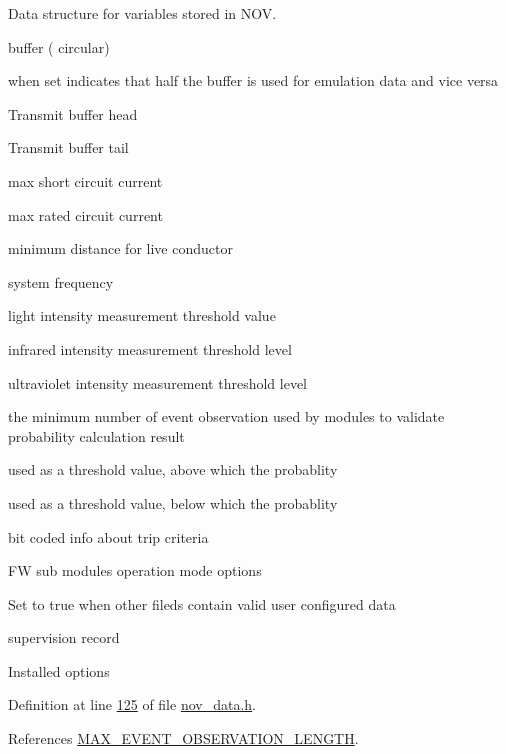 Data structure for variables stored in N\+O\+V. 

buffer ( circular)

when set indicates that half the buffer is used for emulation data and vice versa

Transmit buffer head

Transmit buffer tail

max short circuit current

max rated circuit current

minimum distance for live conductor

system frequency

light intensity measurement threshold value

infrared intensity measurement threshold level

ultraviolet intensity measurement threshold level

the minimum number of event observation used by modules to validate probability calculation result

used as a threshold value, above which the probablity

used as a threshold value, below which the probablity

bit coded info about trip criteria

F\+W sub modules operation mode options

Set to true when other fileds contain valid user configured data

supervision record

Installed options 

Definition at line \hyperlink{a00022_source_l00125}{125} of file \hyperlink{a00022_source}{nov\+\_\+data.\+h}.



References \hyperlink{a00022_source_l00016}{M\+A\+X\+\_\+\+E\+V\+E\+N\+T\+\_\+\+O\+B\+S\+E\+R\+V\+A\+T\+I\+O\+N\+\_\+\+L\+E\+N\+G\+T\+H}.


